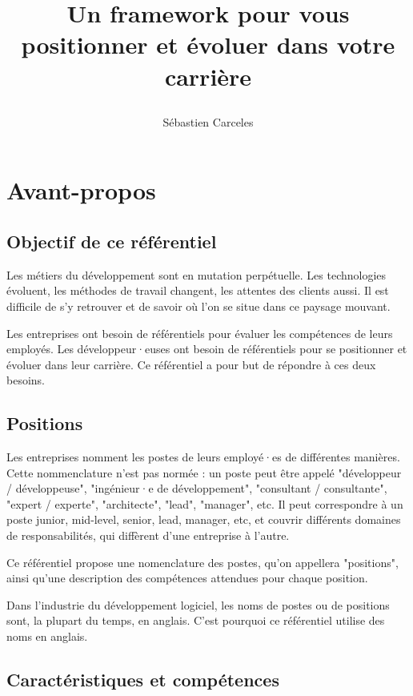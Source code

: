\documentclass[a4paper, french, openany, 12pt]{book}
\title{
  \vspace*{-8cm}

  \fullwidthimage{images/cover.jpg}

  \vspace*{5cm}

  \bsc{Référenciel de compétences pour développeurs et développeuses}

  Un framework pour vous positionner et évoluer dans votre carrière
}
\author{Sébastien Carceles}
\date{}
\begin{document}
\begin{titlepage}
  \maketitle
\end{titlepage}

\frontmatter

\chapter{Avant-propos}

\section*{Objectif de ce référentiel}

Les métiers du développement sont en mutation perpétuelle.
Les technologies évoluent, les méthodes de travail changent, les attentes des clients aussi.
Il est difficile de s'y retrouver et de savoir où l'on se situe dans ce paysage mouvant.

Les entreprises ont besoin de référentiels pour évaluer les compétences de leurs employés.
Les développeur·euses ont besoin de référentiels pour se positionner et évoluer dans leur carrière.
Ce référentiel a pour but de répondre à ces deux besoins.

\section*{Positions}

Les entreprises nomment les postes de leurs employé·es de différentes manières.
Cette nommenclature n'est pas normée : un poste peut être appelé "développeur / développeuse", "ingénieur·e de 
développement", "consultant / consultante", "expert / experte", "architecte", "lead", "manager", etc.
Il peut correspondre à un poste junior, mid-level, senior, lead, manager, etc, et couvrir différents domaines de 
responsabilités, qui diffèrent d'une entreprise à l'autre.

Ce référentiel propose une nomenclature des postes, qu'on appellera "positions",
ainsi qu'une description des compétences attendues pour chaque position.

Dans l'industrie du développement logiciel, les noms de postes ou de positions sont, la plupart du temps, en anglais.
C'est pourquoi ce référentiel utilise des noms en anglais.

\section*{Caractéristiques et compétences}
\end{document}
